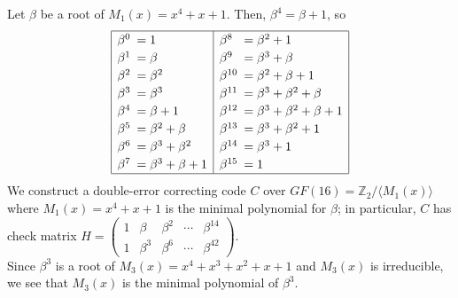 \documentclass[11pt]{article}
\newcommand{\vc}[1]{\begin{pmatrix}#1\end{pmatrix}}
\begin{document}
\medskip
{}
Let $\beta$ be a root of $M_1(x) = x^4 + x + 1$.
Then, $\beta^4 = \beta + 1$, so
  \[{\renewcommand*{\arraystretch}{1.2}
    \begin{array}{|ll|ll|}\hline
     \beta^0 \!\!\!&= 1                    & \beta^8   \!\!\!&= \beta^2 + 1\\
     \beta^1 \!\!\!&= \beta                & \beta^9   \!\!\!&= \beta^3 + \beta\\
     \beta^2 \!\!\!&= \beta^2              & \beta^{10}\!\!\!&= \beta^2 + \beta + 1\\
     \beta^3 \!\!\!&= \beta^3              & \beta^{11}\!\!\!&= \beta^3 + \beta^2 + \beta\\
     \beta^4 \!\!\!&= \beta   + 1          & \beta^{12}\!\!\!&= \beta^3 + \beta^2 + \beta + 1\\
     \beta^5 \!\!\!&= \beta^2 + \beta      & \beta^{13}\!\!\!&= \beta^3 + \beta^2 + 1\\
     \beta^6 \!\!\!&= \beta^3 + \beta^2    & \beta^{14}\!\!\!&= \beta^3 + 1\\
     \beta^7 \!\!\!&= \beta^3 + \beta + 1  & \beta^{15}\!\!\!&= 1\\\hline
  \end{array}}\]
We construct a double-error correcting code $C$ over $GF(16) = \mathbb{Z}_2/\langle M_1(x)\rangle$
where $M_1(x) = x^4 + x + 1$ is the minimal polynomial for $\beta$;
in particular, $C$ has check matrix $H =
                     \vc{1 & \beta   & \beta^2 &\cdots&\beta^{14}\\
                         1 & \beta^3 & \beta^6 &\cdots&\beta^{42}}$.\\
Since $\beta^3$ is a root of $M_3(x) = x^4+x^3+x^2+x+1$ and $M_3(x)$ is irreducible,
we see that $M_3(x)$ is the minimal polynomial of $\beta^3$.
\end{document}
